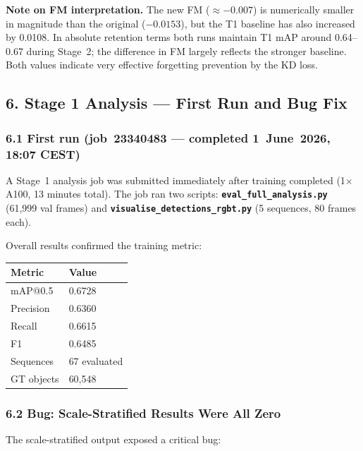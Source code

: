 \noindent \textbf{Note on FM interpretation.}
The new FM ($\approx -0.007$) is numerically smaller in magnitude than
the original ($-0.0153$), but the T1 baseline has also increased
by 0.0108. In absolute retention terms both runs maintain T1 mAP
around 0.64--0.67 during Stage~2; the difference in FM largely reflects
the stronger baseline. Both values indicate very effective forgetting
prevention by the KD loss.

\subsection*{6. Stage 1 Analysis — First Run and Bug Fix}

\subsubsection*{6.1 First run (job~23340483 — completed 1~June~2026, 18:07 CEST)}

A Stage~1 analysis job was submitted immediately after training completed
(1$\times$A100, 13 minutes total). The job ran two scripts:
\textbf{\texttt{eval\_full\_analysis.py}} (61,999 val frames) and
\textbf{\texttt{visualise\_detections\_rgbt.py}} (5 sequences,
80 frames each).

Overall results confirmed the training metric:

\begin{center}\small
\begin{tabular}{ll}
\hline
\textbf{Metric}  & \textbf{Value} \\
\hline
mAP@0.5          & 0.6728 \\
Precision        & 0.6360 \\
Recall           & 0.6615 \\
F1               & 0.6485 \\
Sequences        & 67 evaluated \\
GT objects       & 60,548 \\
\hline
\end{tabular}
\end{center}

\subsubsection*{6.2 Bug: Scale-Stratified Results Were All Zero}

The scale-stratified output exposed a critical bug:

